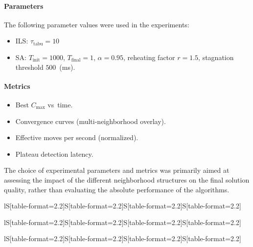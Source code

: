 \documentclass[10pt,twoside,twocolumn,a4paper]{article}
\begin{document}
\paragraph{Parameters}
The following parameter values were used in the experiments:
\begin{itemize}
  \item ILS: $\tau_{\text{tabu}} = 10$
  \item SA: $T_{\text{init}}=1000$, $T_{\text{final}}=1$, $\alpha=0.95$,
        reheating factor $r = 1.5$, stagnation threshold $500$~(ms).
\end{itemize}

\paragraph{Metrics}
\begin{itemize}
  \item Best $C_{\max}$ vs\ time.
  \item Convergence curves (multi-neighborhood overlay).
  \item Effective moves per second (normalized).
  \item Plateau detection latency.
\end{itemize}
The choice of experimental parameters and metrics was primarily aimed at
assessing the impact of the different neighborhood structures on the final
solution quality, rather than evaluating the absolute performance of the
algorithms.



\begin{table}
\caption{Average RPD~[\%] from the optimum, $t_{\mathrm{ms}}=100$~ms}
\label{tab:results_100}
\begin{tabular}{lS[table-format=2.2]S[table-format=2.2]S[table-format=2.2]S[table-format=2.2]}

\end{tabular}
\end{table}

\begin{table}
\caption{Average RPD~[\%] from the optimum, $t_{\mathrm{ms}}=500$~ms}
\label{tab:results_500}
\begin{tabular}{lS[table-format=2.2]S[table-format=2.2]S[table-format=2.2]S[table-format=2.2]}

\end{tabular}
\end{table}

\begin{table}
\caption{Average RPD~[\%] from the optimum, $t_{\mathrm{ms}}=1000$~ms}
\label{tab:results_1000}
\begin{tabular}{lS[table-format=2.2]S[table-format=2.2]S[table-format=2.2]S[table-format=2.2]}

\end{tabular}
\end{table}
\end{document}
